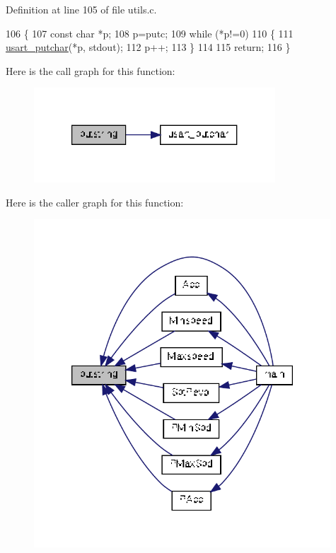 Definition at line 105 of file utils.\-c.


\begin{DoxyCode}
106 \{
107     \textcolor{keyword}{const} \textcolor{keywordtype}{char} *p;
108     p=putc;
109     \textcolor{keywordflow}{while} (*p!=0)
110     \{
111         \hyperlink{group__pfleury__uart_ga5db1b15d2f108232a6162b87c9fb352e}{usart\_putchar}(*p, stdout);
112         p++;
113     \}
114     
115     \textcolor{keywordflow}{return};
116 \}
\end{DoxyCode}


Here is the call graph for this function\-:
\nopagebreak
\begin{figure}[H]
\begin{center}
\leavevmode
\includegraphics[width=256pt]{group__biba__utils_ga354be7728c1265a82ba2510f1800cea4_cgraph}
\end{center}
\end{figure}




Here is the caller graph for this function\-:
\nopagebreak
\begin{figure}[H]
\begin{center}
\leavevmode
\includegraphics[width=314pt]{group__biba__utils_ga354be7728c1265a82ba2510f1800cea4_icgraph}
\end{center}
\end{figure}


